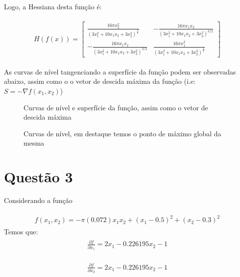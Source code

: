 \documentclass[fleqn, 11pt]{article}
\begin{document}
Logo, a Hessiana desta função é:

\begin{align*}
\begin{split}
H(f(x)) =
\begin{bmatrix}
\frac{16 \pi x_2 ^{2}}{(3x_1 ^{2}+10x_1 x_2 +3x_2 ^{2})^{\frac{3}{2}}} & -\frac{16 \pi x_1  x_2 }{(3 x_1 ^2 + 10 x_1  x_2  + 3 x_2 ^2)^{3/2}} \\
-\frac{16 \pi x_1  x_2 }{(3 x_1 ^2 + 10 x_1  x_2  + 3 x_2 ^2)^{3/2}} & \frac{16 \pi x_1 ^{2}}{(3x_1 ^{2}+10x_1 x_2 +3x_2 ^{2})^{\frac{3}{2}}}
\end{bmatrix}
\end{split}
\end{align*}

As curvas de nível tangenciando a superfície da função podem ser observadas abaixo, assim como o o vetor de descida máxima da função (i.e: $S = -\nabla f(x_1, x_2)$)

\begin{figure}[H]
\label{figure:fig1}
   \caption{Curvas de nível e superfície da função, assim como o vetor de descida máxima}
\end{figure}
\begin{figure}[H]
\label{figure:fig1}
   \caption{Curvas de nível, em destaque temos o ponto de máximo global da mesma}
\end{figure}


\newpage
\section*{Questão 3}
Considerando a função

\begin{align*}
\begin{split}
f(x_1,x_2) = -\pi  (0.072) x_{1} x_{2} + (x_{1}-0.5)^{2} + (x_{2}-0.3)^2
\end{split}
\end{align*}
Temos que:
\begin{align*}
\begin{split}
\frac{\partial f}{\partial 	x_1} = 2x_{1} - 0.226195 x_{2} - 1
\end{split}
\end{align*}

\begin{align*}
\begin{split}
\frac{\partial f}{\partial 	x_2} = 2x_{1} - 0.226195 x_{2} - 1
\end{split}
\end{align*}
\end{document}
